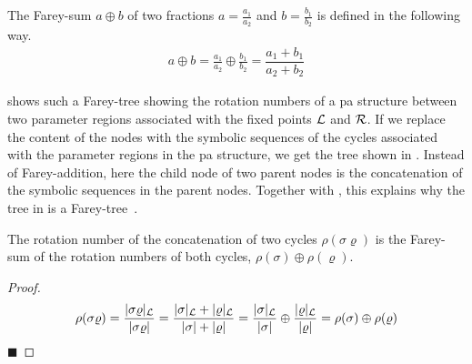 \begin{definition}
	The Farey-sum $a \oplus b$ of two fractions $a = \frac{a_1}{a_2}$ and $b = \frac{b_1}{b_2}$ is defined in the following way.
	\begin{align}
		a \oplus b = \frac{a_1}{a_2} \oplus \frac{b_1}{b_2} = \dfrac{a_1 + b_1}{a_2 + b_2}
	\end{align}
\end{definition}

 shows such a Farey-tree showing the rotation numbers of a \gls{pa} structure between two parameter regions associated with the fixed points $\mathcal{L}$ and $\mathcal{R}$.
If we replace the content of the nodes with the symbolic sequences of the cycles associated with the parameter regions in the \gls{pa} structure, we get the tree shown in .
Instead of Farey-addition, here the child node of two parent nodes is the concatenation of the symbolic sequences in the parent nodes.
Together with , this explains why the  tree in  is a Farey-tree~\cite{granados14adding}.

\clearpage

\begin{theorem}
	The rotation number of the concatenation of two cycles $\rho(\sigma\varrho)$ is the Farey-sum of the rotation numbers of both cycles, $\rho(\sigma) \oplus \rho(\varrho)$.
	\label{theorem:state.rot.num.concat}
\end{theorem}

\begin{proof}
	\begin{align*}
		\rho(\sigma\varrho)
		= \dfrac{|\sigma\varrho|_{\mathcal{L}}}{|\sigma\varrho|}
		= \dfrac{|\sigma|_{\mathcal{L}} + |\varrho|_{\mathcal{L}}}{|\sigma| + |\varrho|}
		= \dfrac{|\sigma|_{\mathcal{L}}}{|\sigma|} \oplus \dfrac{|\varrho|_{\mathcal{L}}}{|\varrho|}
		= \rho(\sigma) \oplus \rho(\varrho)
	\end{align*}
	\hfill $\blacksquare$
\end{proof}

